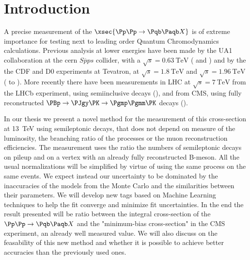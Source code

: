 \section{Introduction}

A precise measurement of the $\xsec{\Pp\Pp\to\Pqb\Paqb X}$ is of extreme importance for testing next to leading order Quantum Chromodynamics calculations.
Previous analysis at lower energies have been made by the UA1 collaboration at the cern $S\overline{p}ps$ collider, with a $\sqrt{s} = \SI{0.63}{\TeV}$ (\cite{bib:spps1} and \cite{bib:spps2}) and by the the CDF and D0 experiments at Tevatron, at $\sqrt{s}=\SI{1.8}{\TeV}$ and $\sqrt{s}=\SI{1.96}{\TeV}$ (\cite{bib:CDF1} to \cite{bib:D0last}).
More recently there have been measurements in LHC at $\sqrt{s}=\SI{7}{\TeV}$ from the LHCb experiment, using semiinclusive decays (\cite{bib:LHCb_bb}), and from CMS, using fully reconstructed $\PBp\to\PJgy\PK\to\Pgmp\Pgmm\PK$ decays (\cite{bib:CMS_bb}).


In our thesis we present a novel method for the measurement of this cross-section at \SI{13}{\TeV} using semileptonic decays, that does not depend on measure of the luminosity, the branching ratio of the processes or the muon reconstruction efficiencies.
The measurement uses the ratio the numbers of semileptonic decays on pileup and on a vertex with an already fully reconstructed B-meson.
All the usual normalizations will be simplified by virtue of using the same process on the same events.
We expect instead our uncertainty to be dominated by the inaccuracies of the models from the Monte Carlo and the similarities between their parameters.
We will develop new tags based on Machine Learning techniques to help the fit converge and minimize fit uncertainties.
In the end the result presented will be ratio between the integral cross-section of the $\Pp\Pp\to\Pqb\Paqb X$ and the "minimum-bias cross-section" in the CMS experiment, an already well measured value.
We will also discuss on the feasability of this new method and whether it is possible to achieve better accuracies than the previously used ones.



